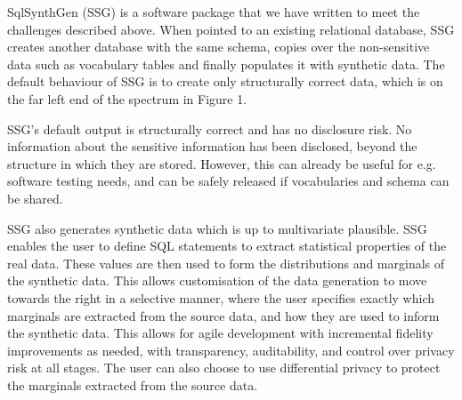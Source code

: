 \documentclass[11pt]{article}
\begin{document}


SqlSynthGen (SSG) is a software package that we have written to meet the challenges described above. When pointed to an existing relational database, SSG creates another database with the same schema, copies over the non-sensitive data such as vocabulary tables and finally populates it with synthetic data. The default behaviour of SSG is to create only structurally correct data, which is on the far left end of the spectrum in Figure 1. 

SSG's default output is structurally correct and has no disclosure risk. No information about the sensitive information has been disclosed, beyond the structure in which they are stored. However, this can already be useful for e.g. software testing needs, and can be safely released if vocabularies and schema can be shared.

SSG also generates synthetic data which is up to multivariate plausible. SSG enables the user to define SQL statements to extract statistical properties of the real data. These values are then used to form the distributions and marginals of the synthetic data. This allows customisation of the data generation to move towards the right in a selective manner, where the user specifies exactly which marginals are extracted from the source data, and how they are used to inform the synthetic data. This allows for agile development with incremental fidelity improvements as needed, with transparency, auditability, and control over privacy risk at all stages. The user can also choose to use differential privacy to protect the marginals extracted from the source data.
\end{document}
